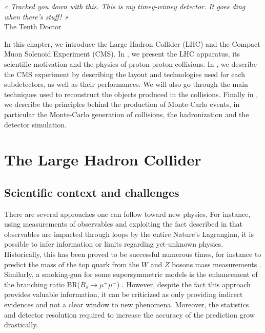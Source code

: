 \setcounter{mtc}{3}
\vspace*{-0.7cm}
\hspace*{0.39\textwidth}
\begin{minipage}{0.6\textwidth}
\emph{« Tracked you down with this. This is my timey-wimey detector. It goes ding when there’s stuff! »}\\
\hspace*{0.6\textwidth} The Tenth Doctor
\end{minipage}
\minitoc
\newpage

    In this chapter, we introduce the Large Hadron Collider (LHC) and the Compact Muon Solenoid
    Experiment (CMS). In , we present the LHC apparatus,
    its scientific motivation and the physics of proton-proton collisions. In ,
    we describe the CMS experiment by describing the layout and technologies used for each
    subdetectors, as well as their performances. We will also go through the main techniques
    used to reconstruct the objects produced in the collisions. Finally in ,
    we describe the principles behind the production of Monte-Carlo events, in particular
    the Monte-Carlo generation of collisions, the hadronization and the detector simulation.

    \section{The Large Hadron Collider \label{sec:LHCintro}}

    \subsection{Scientific context and challenges}

    There are several approaches one can follow toward new physics. For instance, using
     measurements of observables and exploiting the fact described in
     that observables are impacted through loops by
    the entire Nature's Lagrangian, it is possible to infer information or limits regarding
    yet-unknown physics. Historically, this has been proved to be successful numerous times,
    for instance to predict the mass of the top quark from the $W$ and $Z$ bosons mass
    measurements \cite{discoveryOfTopQuark}. Similarly, a smoking-gun for some supersymmetric
    models is the enhancement of the branching ratio BR($B_s \rightarrow \mu^+\mu^-$)
    \cite{BsToMuMu}. However,
    despite the fact this approach provides valuable information, it can be criticized as
    only providing indirect evidences and not a clear window to new phenomena. Moreover,
    the statistics and detector resolution required to increase the accuracy of the
    prediction grow drastically.


